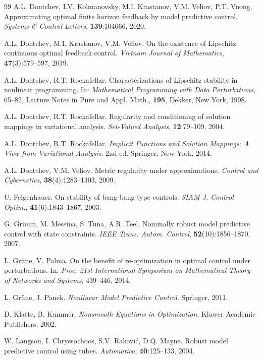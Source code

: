 \documentclass[11pt]{article}
\begin{document}
\begin{thebibliography}{99}
A.L. Dontchev, I.V. Kolmanovsky, M.I. Krastanov, V.M. Veliov, P.T. Vuong.
Approximating optimal finite horizon feedback by model predictive control.
{\em Systems \& Control Letters}, {\bf 139}:104666, 2020.

A.L. Dontchev, M.I. Krastanov, V.M. Veliov.
On the existence of Lipschitz continuous optimal feedback control. 
{\em Vietnam Journal of Mathematics}, {\bf 47}(3):579--597, 2019.

A.L. Dontchev, R.T. Rockafellar. 
Characterizations of Lipschitz stability in nonlinear programming. 
In: {\em Mathematical Programming with Data Perturbations}, 65--82, 
Lecture Notes in Pure and Appl. Math., {\bf 195}, Dekker, New York, 1998.

A.L. Dontchev, R.T. Rockafellar.
Regularity and conditioning of solution mappings in variational analysis. 
{\em Set-Valued Analysis}, {\bf 12}:79--109, 2004. 

A.L. Dontchev, R.T. Rockafellar.
{\em Implicit Functions and Solution Mappings: A View from Variational Analysis}. 2nd ed.
Springer, New York, 2014.

A.L. Dontchev, V.M. Veliov.
Metric regularity under approximations.
{\em Control and Cybernetics}, {\bf 38}(4):1283--1303, 2009.

U. Felgenhauer. On stability of bang-bang type controls.
{\em SIAM J. Control Optim.}, {\bf 41}(6):1843--1867, 2003.

G. Grimm, M. Messina, S. Tuna, A.R. Teel.
Nominally robust model predictive control with state constraints.
{\em IEEE Trans. Autom. Control}, {\bf 52}(10):1856--1870, 2007.

L. Gr\"une, V. Palma.
On the benefit of re-optimization in optimal control under perturbations.
In: {\em Proc. 21st International Symposium on Mathematical Theory of Networks and Systems}, 439--446, 2014.

L. Gr\"une, J. Panek. {\em Nonlinear Model Predictive Control}. Springer, 2011.

D. Klatte, B. Kummer. {\em Nonsmooth Equations in Optimization}.
Kluwer Academic Publishers, 2002.

W. Langson, I. Chryssochoos, S.V. Rakovi\'c, D.Q. Mayne.
Robust model predictive control using tubes.
{\em Automatica}, {\bf 40}:125--133, 2004.


\end{thebibliography}
\end{document}
